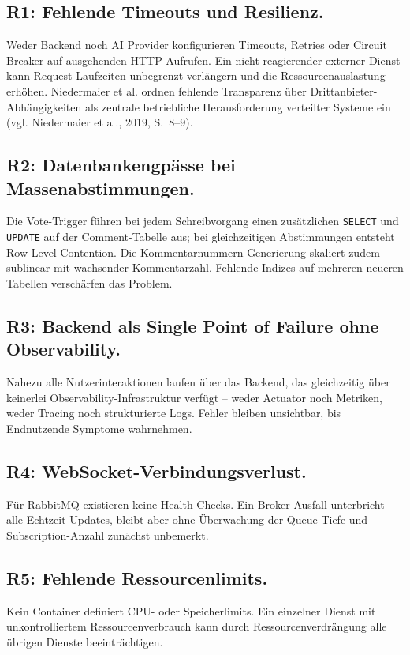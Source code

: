 \subsection{R1: Fehlende Timeouts und Resilienz.}
Weder Backend noch AI Provider konfigurieren Timeouts, Retries oder Circuit Breaker auf ausgehenden HTTP-Aufrufen. Ein nicht reagierender externer Dienst kann Request-Laufzeiten unbegrenzt verlängern und die Ressourcenauslastung erhöhen. Niedermaier et al. ordnen fehlende Transparenz über Drittanbieter-Abhängigkeiten als zentrale betriebliche Herausforderung verteilter Systeme ein (vgl. Niedermaier et al., 2019, S.~8--9).
 
\subsection{R2: Datenbankengpässe bei Massenabstimmungen.}
Die Vote-Trigger führen bei jedem Schreibvorgang einen zusätzlichen \texttt{SELECT} und \texttt{UPDATE} auf der Comment-Tabelle aus; bei gleichzeitigen Abstimmungen entsteht Row-Level Contention. Die Kommentarnummern-Generierung skaliert zudem sublinear mit wachsender Kommentarzahl. Fehlende Indizes auf mehreren neueren Tabellen verschärfen das Problem.
 
\subsection{R3: Backend als Single Point of Failure ohne Observability.}
Nahezu alle Nutzerinteraktionen laufen über das Backend, das gleichzeitig über keinerlei Observability-Infrastruktur verfügt -- weder Actuator noch Metriken, weder Tracing noch strukturierte Logs. Fehler bleiben unsichtbar, bis Endnutzende Symptome wahrnehmen.
 
\subsection{R4: WebSocket-Verbindungsverlust.}
Für RabbitMQ existieren keine Health-Checks. Ein Broker-Ausfall unterbricht alle Echtzeit-Updates, bleibt aber ohne Überwachung der Queue-Tiefe und Subscription-Anzahl zunächst unbemerkt.
 
\subsection{R5: Fehlende Ressourcenlimits.}
Kein Container definiert CPU- oder Speicherlimits. Ein einzelner Dienst mit unkontrolliertem Ressourcenverbrauch kann durch Ressourcenverdrängung alle übrigen Dienste beeinträchtigen.
 
